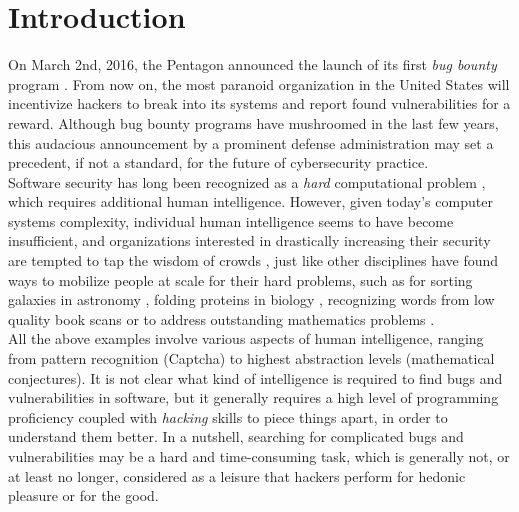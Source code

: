 \section{Introduction}
\label{sec:intro}
On March 2nd, 2016, the Pentagon announced the launch of its first {\it bug bounty} program \cite{Pentagon}. From now on, the most paranoid organization in the United States will incentivize hackers to break into its systems and report found vulnerabilities for a reward. Although bug bounty programs have mushroomed in the last few years, this audacious announcement by a prominent defense administration may set a precedent, if not a standard, for the future of cybersecurity practice.\\ 

Software security has long been recognized as a {\it hard} computational problem \cite{adams1984textordfeminineoptimizing}, which requires additional human intelligence. However, given today's computer systems complexity, individual human intelligence seems to have become insufficient, and organizations interested in drastically increasing their security are tempted to tap the wisdom of crowds \cite{surowiecki2005wisdom}, just like other disciplines have found ways to mobilize people at scale for their hard problems, such as for sorting galaxies in astronomy \cite{smith2013introduction}, folding proteins in biology \cite{khatib2011algorithm}, recognizing words from low quality book scans \cite{von2003captcha} or to address outstanding mathematics problems \cite{gowers2009massively,cranshaw2011polymath}.\\ 

All the above examples involve various aspects of human intelligence, ranging from pattern recognition (Captcha) to highest abstraction levels (mathematical conjectures). It is not clear what kind of intelligence is required to find bugs and vulnerabilities in software, but it generally requires a high level of programming proficiency coupled with {\it hacking} skills to piece things apart, in order to understand them better. In a nutshell, searching for complicated  bugs and vulnerabilities may be a hard and time-consuming task, which is generally not, or at least no longer, considered as a leisure that hackers perform for hedonic pleasure or for the good.\\


